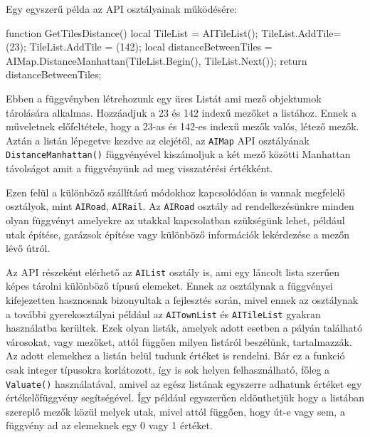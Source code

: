 Egy egyszerű példa az API osztályainak működésére:
\begin{cpp}
function GetTilesDistance()
{
  local TileList = AITileList();
  TileList.AddTile= (23);
  TileList.AddTile = (142);
  local distanceBetweenTiles =
  AIMap.DistanceManhattan(TileList.Begin(), TileList.Next());
  return distanceBetweenTiles;
}
\end{cpp}
Ebben a függvényben létrehozunk egy üres Listát ami mező objektumok tárolására alkalmas. Hozzáadjuk a 23 és 142 indexű mezőket a listához. Ennek a műveletnek előfeltétele, hogy a 23-as és 142-es indexű mezők valós, létező mezők. Aztán a listán lépegetve kezdve az elejétől, az \texttt{AIMap} API osztályának \texttt{DistanceManhattan()} függvényével kiszámoljuk a két mező közötti Manhattan távolságot amit a függvényünk ad meg visszatérési értékként.

Ezen felül a különböző szállítású módokhoz kapcsolódóan is vannak megfelelő osztályok, mint \texttt{AIRoad}, \texttt{AIRail}. Az \texttt{AIRoad} osztály ad rendelkezésünkre minden olyan függvényt amelyekre az utakkal kapcsolatban szükségünk lehet, például utak építése, garázsok építése vagy különböző információk lekérdezése a mezőn lévő útról.

Az API részeként elérhető az \texttt{AIList} osztály is, ami egy láncolt lista szerűen képes tárolni különböző típusú elemeket. Ennek az osztálynak a függvényei kifejezetten hasznosnak bizonyultak a fejlesztés során, mivel ennek az osztálynak a további gyerekosztályai például az \texttt{AITownList} és \texttt{AITileList} gyakran használatba kerültek. Ezek olyan listák, amelyek adott esetben a pályán található városokat, vagy mezőket, attól függően milyen listáról beszélünk, tartalmazzák. Az adott elemekhez a listán belül tudunk értéket is rendelni. Bár ez a funkció csak integer típusokra korlátozott, így is sok helyen felhasználható, főleg a \texttt{Valuate()} használatával, amivel az egész listának egyszerre adhatunk értéket egy értékelőfüggvény segítségével. Így például egyszerűen eldönthetjük hogy a listában szereplő mezők közül melyek utak, mivel attól függően, hogy út-e vagy sem, a függvény ad az elemeknek egy 0 vagy 1 értéket.


